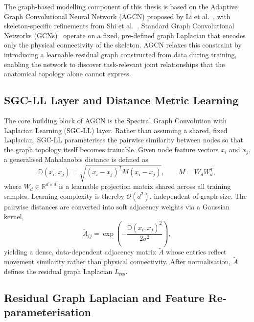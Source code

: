 The graph-based modelling component of this thesis is based on the Adaptive Graph Convolutional Neural Network (AGCN) proposed by Li et al.~\cite{li2018adaptive}, with skeleton-specific refinements from Shi et al.~\cite{shi2019skeleton}. Standard Graph Convolutional Networks (GCNs)~\cite{yan2018spatial} operate on a fixed, pre-defined graph Laplacian that encodes only the physical connectivity of the skeleton. AGCN relaxes this constraint by introducing a learnable residual graph constructed from data during training, enabling the network to discover task-relevant joint relationships that the anatomical topology alone cannot express.

\subsection{SGC-LL Layer and Distance Metric Learning}

The core building block of AGCN is the Spectral Graph Convolution with Laplacian Learning (SGC-LL) layer. Rather than assuming a shared, fixed Laplacian, SGC-LL parameterises the pairwise similarity between nodes so that the graph topology itself becomes trainable. Given node feature vectors $x_i$ and $x_j$, a generalised Mahalanobis distance is defined as
\begin{equation}
    \mathbb{D}(x_i, x_j) = \sqrt{(x_i - x_j)^{T} M (x_i - x_j)}, \qquad M = W_d W_d^{T},
    \label{eq:agcn_distance}
\end{equation}
where $W_d \in \mathbb{R}^{d \times d}$ is a learnable projection matrix shared across all training samples. Learning complexity is thereby $\mathcal{O}(d^2)$, independent of graph size. The pairwise distances are converted into soft adjacency weights via a Gaussian kernel,
\begin{equation}
    \tilde{A}_{ij} = \exp\!\left(-\frac{\mathbb{D}(x_i, x_j)^{2}}{2\sigma^{2}}\right),
\end{equation}
yielding a dense, data-dependent adjacency matrix $\tilde{A}$ whose entries reflect movement similarity rather than physical connectivity. After normalisation, $\tilde{A}$ defines the residual graph Laplacian $L_{\mathrm{res}}$.

\subsection{Residual Graph Laplacian and Feature Re-parameterisation}

